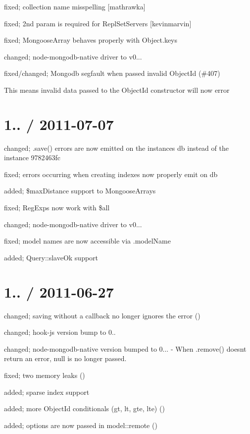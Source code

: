 \begin{DoxyItemize}
\item fixed; collection name misspelling \mbox{[}mathrawka\mbox{]}
\item fixed; 2nd param is required for Repl\+Set\+Servers \mbox{[}kevinmarvin\mbox{]}
\item fixed; Mongoose\+Array behaves properly with Object.\+keys
\item changed; node-\/mongodb-\/native driver to v0...
\item fixed/changed; Mongodb segfault when passed invalid Object\+Id (\#407)
\begin{DoxyItemize}
\item This means invalid data passed to the Object\+Id constructor will now error
\end{DoxyItemize}
\end{DoxyItemize}

\section*{1.. / 2011-\/07-\/07 }


\begin{DoxyItemize}
\item changed; .save() errors are now emitted on the instances db instead of the instance 9782463fc
\item fixed; errors occurring when creating indexes now properly emit on db
\item added; \$max\+Distance support to Mongoose\+Arrays
\item fixed; Reg\+Exps now work with \$all
\item changed; node-\/mongodb-\/native driver to v0...
\item fixed; model names are now accessible via .model\+Name
\item added; Query\+::slave\+Ok support
\end{DoxyItemize}

\section*{1.. / 2011-\/06-\/27 }


\begin{DoxyItemize}
\item changed; saving without a callback no longer ignores the error ()
\item changed; hook-\/js version bump to 0..
\item changed; node-\/mongodb-\/native version bumped to 0... -\/ When .remove() doesn\textquotesingle{}t return an error, null is no longer passed.
\item fixed; two memory leaks ()
\item added; sparse index support
\item added; more Object\+Id conditionals (gt, lt, gte, lte) ()
\item added; options are now passed in model\+::remote ()
\end{DoxyItemize}

